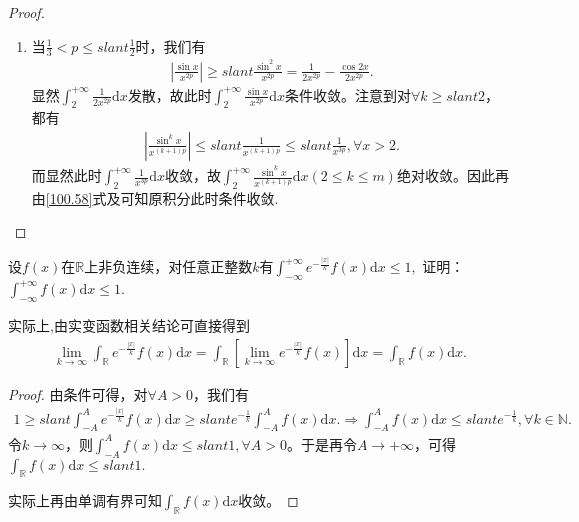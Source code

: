 \documentclass[../../main.tex]{subfiles}
\begin{document}
\begin{proof}
\begin{enumerate}
\begin{enumerate}
\item 当\(\frac{1}{3}<p\leqslant slant \frac{1}{2}\)时，我们有
\begin{align*}
\left|\frac{\sin x}{x^{2p}}\right|\geqslant slant\frac{\sin^2 x}{x^{2p}}=\frac{1}{2x^{2p}}-\frac{\cos 2x}{2x^{2p}}.
\end{align*}
显然\(\int_{2}^{+\infty}\frac{1}{2x^{2p}}\mathrm{d}x\)发散，故此时\(\int_{2}^{+\infty}\frac{\sin x}{x^{2p}}\mathrm{d}x\)条件收敛。注意到对\(\forall k\geqslant slant 2\)，都有
\begin{align*}
\left|\frac{\sin^k x}{x^{(k + 1)p}}\right|\leqslant slant\frac{1}{x^{(k + 1)p}}\leqslant slant\frac{1}{x^{3p}},\forall x > 2.
\end{align*}
而显然此时\(\int_{2}^{+\infty}\frac{1}{x^{3p}}\mathrm{d}x\)收敛，故\(\int_{2}^{+\infty}\frac{\sin^k x}{x^{(k + 1)p}}\mathrm{d}x(2\leqslant  k\leqslant  m)\)绝对收敛。因此再由\eqref{100.58}式及可知原积分此时条件收敛.
\end{enumerate} 
\end{enumerate}
\end{proof}

\begin{example}
设\(f(x)\)在\(\mathbb{R}\)上非负连续，对任意正整数\(k\)有$\int_{-\infty}^{+\infty} e^{-\frac{|x|}{k}}f(x)\mathrm{d}x \leqslant  1,$
证明：$\int_{-\infty}^{+\infty}f(x)\mathrm{d}x \leqslant  1.$
\end{example}
\begin{remark}
实际上,由实变函数相关结论可直接得到
\begin{align*}
\lim_{k\rightarrow \infty}\int_{\mathbb{R}}e^{-\frac{| x |}{k}}f( x ) \mathrm{d}x=\int_{\mathbb{R}}\left[ \lim_{k\rightarrow \infty}e^{-\frac{| x |}{k}}f( x ) \right] \mathrm{d}x=\int_{\mathbb{R}}f( x ) \mathrm{d}x.
\end{align*}
\end{remark}
\begin{proof}
由条件可得，对$\forall A>0$，我们有
\begin{align*}
1\geqslant slant \int_{-A}^Ae^{-\frac{| x |}{k}}f( x ) \mathrm{d}x\geqslant slant e^{-\frac{1}{k}}\int_{-A}^Af( x ) \mathrm{d}x.\Rightarrow \int_{-A}^Af( x ) \mathrm{d}x\leqslant slant e^{-\frac{1}{k}},\forall k\in \mathbb{N} .
\end{align*}
令$k\rightarrow \infty$，则$\int_{-A}^Af( x ) \mathrm{d}x\leqslant slant 1,\forall A>0$。于是再令$A\rightarrow +\infty$，可得$\int_{\mathbb{R}}f( x ) \mathrm{d}x\leqslant slant 1.$

实际上再由单调有界可知$\int_{\mathbb{R}}f( x ) \mathrm{d}x$收敛。
\end{proof}
\end{document}
